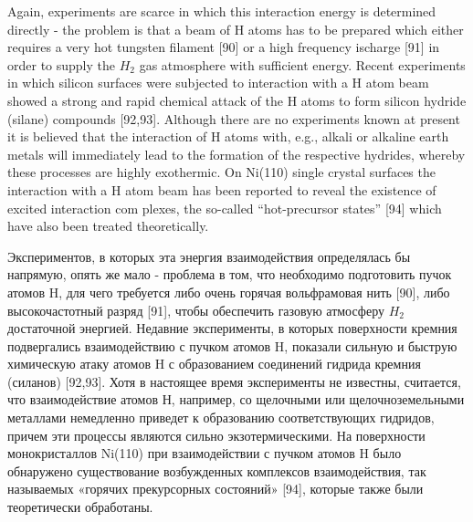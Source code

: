 \documentclass[11pt]{article}
\makeatletter
\newcommand{\boxspacing}{\kern\kvtcb@left@rule\kern\kvtcb@boxsep}
\newcommand{\prompt}[4]{
        {\ttfamily\llap{{\color{#2}[#3]:\hspace{3pt}#4}}\vspace{-\baselineskip}}
    }
\makeatother
\begin{document}
Again, experiments are scarce in which this interaction energy is
determined directly - the problem is that a beam of H atoms has to be
prepared which either requires a very hot tungsten filament {[}90{]} or
a high frequency ischarge {[}91{]} in order to supply the \(H_2\) gas
atmosphere with sufficient energy. Recent experiments in which silicon
surfaces were subjected to interaction with a H atom beam showed a
strong and rapid chemical attack of the H atoms to form silicon hydride
(silane) compounds {[}92,93{]}. Although there are no experiments known
at present it is believed that the interaction of H atoms with, e.g.,
alkali or alkaline earth metals will immediately lead to the formation
of the respective hydrides, whereby these processes are highly
exothermic. On Ni(110) single crystal surfaces the interaction with a H
atom beam has been reported to reveal the existence of excited
interaction com plexes, the so-called ``hot-precursor states'' {[}94{]}
which have also been treated theoretically.

Экспериментов, в которых эта энергия взаимодействия определялась бы
напрямую, опять же мало - проблема в том, что необходимо подготовить
пучок атомов H, для чего требуется либо очень горячая вольфрамовая нить
{[}90{]}, либо высокочастотный разряд {[}91{]}, чтобы обеспечить газовую
атмосферу \(H_2\) достаточной энергией. Недавние эксперименты, в которых
поверхности кремния подвергались взаимодействию с пучком атомов H,
показали сильную и быструю химическую атаку атомов H с образованием
соединений гидрида кремния (силанов) {[}92,93{]}. Хотя в настоящее время
эксперименты не известны, считается, что взаимодействие атомов Н,
например, со щелочными или щелочноземельными металлами немедленно
приведет к образованию соответствующих гидридов, причем эти процессы
являются сильно экзотермическими. На поверхности монокристаллов Ni(110)
при взаимодействии с пучком атомов H было обнаружено существование
возбужденных комплексов взаимодействия, так называемых «горячих
прекурсорных состояний» {[}94{]}, которые также были теоретически
обработаны.

    \begin{tcolorbox}[breakable, size=fbox, boxrule=1pt, pad at break*=1mm,colback=cellbackground, colframe=cellborder]
\prompt{In}{incolor}{ }{\boxspacing}
\begin{Verbatim}[commandchars=\\\{\}]

\end{Verbatim}
\end{tcolorbox}
\end{document}
